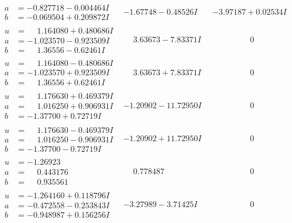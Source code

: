 \documentclass[1p]{elsarticle_modified}
\theoremstyle{definition}
\begin{document}
$$\begin{array}{c|c|c}
\begin{aligned}
a &= -0.827718 - 0.004464 I \\
b &= -0.069504 + 0.209872 I\end{aligned}
 & -1.67748 - 0.48526 I & -3.97187 + 0.02534 I \\ \hline\begin{aligned}
u &= \phantom{-}1.164080 + 0.480686 I \\
a &= -1.023570 - 0.923509 I \\
b &= \phantom{-}1.36556 - 0.62461 I\end{aligned}
 & \phantom{-}3.63673 - 7.83371 I & \phantom{-0.000000 } 0 \\ \hline\begin{aligned}
u &= \phantom{-}1.164080 - 0.480686 I \\
a &= -1.023570 + 0.923509 I \\
b &= \phantom{-}1.36556 + 0.62461 I\end{aligned}
 & \phantom{-}3.63673 + 7.83371 I & \phantom{-0.000000 } 0 \\ \hline\begin{aligned}
u &= \phantom{-}1.176630 + 0.469379 I \\
a &= \phantom{-}1.016250 + 0.906931 I \\
b &= -1.37700 + 0.72719 I\end{aligned}
 & -1.20902 - 11.72950 I & \phantom{-0.000000 } 0 \\ \hline\begin{aligned}
u &= \phantom{-}1.176630 - 0.469379 I \\
a &= \phantom{-}1.016250 - 0.906931 I \\
b &= -1.37700 - 0.72719 I\end{aligned}
 & -1.20902 + 11.72950 I & \phantom{-0.000000 } 0 \\ \hline\begin{aligned}
u &= -1.26923\phantom{ +0.000000I} \\
a &= \phantom{-}0.443176\phantom{ +0.000000I} \\
b &= \phantom{-}0.935561\phantom{ +0.000000I}\end{aligned}
 & \phantom{-}0.778487\phantom{ +0.000000I} & \phantom{-0.000000 } 0 \\ \hline\begin{aligned}
u &= -1.264160 + 0.118796 I \\
a &= -0.472558 - 0.253843 I \\
b &= -0.948987 + 0.156256 I\end{aligned}
 & -3.27989 - 3.71425 I & \phantom{-0.000000 } 0 \\ \hline\begin{aligned}

\end{aligned}
\end{array}$$
\end{document}
